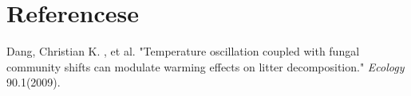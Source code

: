 \section*{Referencese}
\begin{thebibliography}{99}

    Dang, Christian K. , et al. "Temperature oscillation coupled with fungal community shifts can modulate warming effects on litter decomposition." \emph{Ecology} 90.1(2009).
\end{thebibliography}